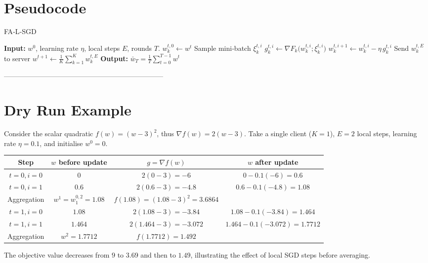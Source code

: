 \documentclass{article}
\begin{document}
\section*{Pseudocode}
\begin{algorithm}[H]
\caption{FA‑L‑SGD}
\begin{algorithmic}[1]
\STATE \textbf{Input:} $w^{0}$, learning rate $\eta$, local steps $E$, rounds $T$.
        \STATE $w_{k}^{t,0}\gets w^{t}$
            \STATE Sample mini‑batch $\xi_{k}^{t,i}$
            \STATE $g_{k}^{t,i}\gets \nabla F_k\!\bigl(w_{k}^{t,i};\xi_{k}^{t,i}\bigr)$
            \STATE $w_{k}^{t,i+1}\gets w_{k}^{t,i}-\eta\,g_{k}^{t,i}$
        \ENDFOR
        \STATE Send $w_{k}^{t,E}$ to server
    \ENDFOR
    \STATE $w^{t+1}\gets \frac1K\sum_{k=1}^{K} w_{k}^{t,E}$ 
\ENDFOR
\STATE \textbf{Output:} $\displaystyle \bar w_T=\frac1T\sum_{t=0}^{T-1} w^{t}$
\end{algorithmic}
\end{algorithm}

---------------------------------------------------------------------

\section*{Dry Run Example}
Consider the scalar quadratic $f(w)=(w-3)^{2}$, thus $\nabla f(w)=2(w-3)$.
Take a single client ($K=1$), $E=2$ local steps, learning rate $\eta=0.1$,
and initialise $w^{0}=0$.

\begin{center}
\begin{tabular}{c|c|c|c}
Step & $w$ before update & $g=\nabla f(w)$ & $w$ after update \\
\hline
$t=0,i=0$ & $0$ & $2(0-3)=-6$ & $0-0.1(-6)=0.6$ \\
$t=0,i=1$ & $0.6$ & $2(0.6-3)=-4.8$ & $0.6-0.1(-4.8)=1.08$ \\
\hline
Aggregation & $w^{1}=w_{1}^{0,2}=1.08$ & $f(1.08)=(1.08-3)^{2}=3.6864$ &  \\
\hline
$t=1,i=0$ & $1.08$ & $2(1.08-3)=-3.84$ & $1.08-0.1(-3.84)=1.464$ \\
$t=1,i=1$ & $1.464$ & $2(1.464-3)=-3.072$ & $1.464-0.1(-3.072)=1.7712$ \\
\hline
Aggregation & $w^{2}=1.7712$ & $f(1.7712)=1.492$ &
\end{tabular}
\end{center}
The objective value decreases from $9$ to $3.69$ and then to $1.49$, illustrating
the effect of local SGD steps before averaging.
\end{document}
